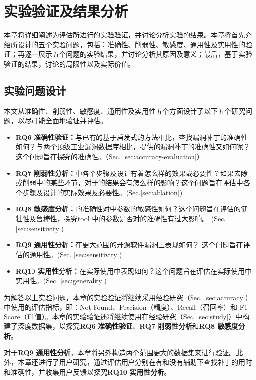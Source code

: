 \chapter{实验验证及结果分析}

本章将详细阐述为评估\tool 所进行的实验验证，并讨论分析实验的结果。本章将首先介绍所设计的五个实验问题，包括：准确性、削弱性、敏感度、通用性及实用性的验证；再逐一展示五个问题的实验结果，并讨论分析其原因及意义；最后，基于实验验证的结果，讨论\tool 的局限性以及实际价值。

\section{实验问题设计}
本文从准确性、削弱性、敏感度、通用性及实用性五个方面设计了以下五个研究问题，以尽可能全面地验证并评估\tool 。

\begin{itemize}[leftmargin=*]
\item \textbf{RQ6 准确性验证：}与已有的基于启发式的方法相比，\tool 查找漏洞补丁的准确性如何？与两个顶级工业漏洞数据库相比，\tool 提供的漏洞补丁的准确性又如何呢？这个问题旨在探究\tool 的准确性。（Sec. \ref{sec:accuracy-evaluation}）
\item \textbf{RQ7 削弱性分析：}\tool 中各个步骤及设计有着怎么样的效果或必要性？如果去除或削弱\tool 中的某些环节，对于\tool 的结果会有怎么样的影响？这个问题旨在评估\tool 中各个步骤及设计的实际效果及必要性。(Sec.\ref{sec:ablation})
\item \textbf{RQ8 敏感度分析：}\tool 的准确性对\tool 中参数的敏感性如何？这个问题旨在评估\tool 的健壮性及鲁棒性，探究tool 中的参数是否对\tool 的准确性有过大影响。 (Sec. \ref{sec:sensitivity})
\item \textbf{RQ9 通用性分析：}\tool 在更大范围的开源软件漏洞上表现如何？ 这个问题旨在评估\tool 的通用性。(Sec. \ref{sec:sensitivity})
\item \textbf{RQ10 实用性分析：}\tool 在实际使用中表现如何？这个问题旨在评估\tool 在实际使用中实用性。(Sec. \ref{sec:generality})
\end{itemize}

为解答以上实验问题，本章的实验验证将继续采用经验研究（Sec. \ref{sec:accuracy}）中使用的评估指标，即：Not Found、Precision（精度）、Recall（召回率）和 F1-Score（F1值）。本章的实验验证还将继续使用在经验研究（Sec. \ref{sec:study}）中构建了深度数据集，以探究\textbf{RQ6 准确性验证}、\textbf{RQ7 削弱性分析}和\textbf{RQ8 敏感度分析}。

对于\textbf{RQ9 通用性分析}，本章将另外构造两个范围更大的数据集来进行验证。此外，本章还进行了用户研究，通过评估用户分别在有和没有\tool 辅助下查找补丁的用时和准确性，并收集用户反馈以探究\textbf{RQ10 实用性分析}。


